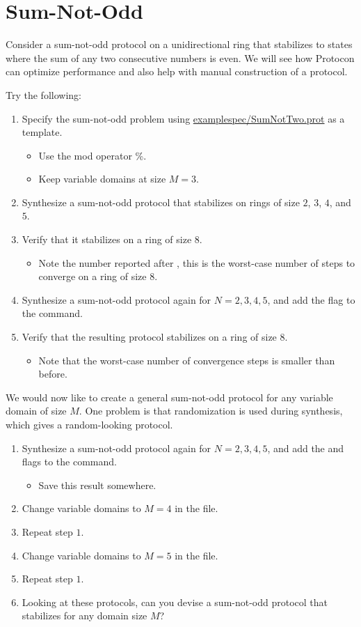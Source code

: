 \section{Sum-Not-Odd}

Consider a sum-not-odd protocol on a unidirectional ring that stabilizes to states where the sum of any two consecutive numbers is even.
We will see how Protocon can optimize performance and also help with manual construction of a protocol.

Try the following:
\begin{enumerate}
\item Specify the sum-not-odd problem using \href{\examplespec/SumNotTwo.prot}{examplespec/SumNotTwo.prot} as a template.
 \begin{itemize}
 \item Use the mod operator \%.
 \item Keep variable domains at size $M=3$.
 \end{itemize}
\item Synthesize a sum-not-odd protocol that stabilizes on rings of size $2$, $3$, $4$, and $5$.
\item Verify that it stabilizes on a ring of size $8$.
 \begin{itemize}
 \item Note the number reported after , this is the worst-case number of steps to converge on a ring of size $8$.
 \end{itemize}
\item Synthesize a sum-not-odd protocol again for $N=2,3,4,5$, and add the  flag to the command.
\item Verify that the resulting protocol stabilizes on a ring of size $8$.
 \begin{itemize}
 \item Note that the worst-case number of convergence steps is smaller than before.
 \end{itemize}
\end{enumerate}

We would now like to create a general sum-not-odd protocol for any variable domain of size $M$.
One problem is that randomization is used during synthesis, which gives a random-looking protocol.
\begin{enumerate}
\item Synthesize a sum-not-odd protocol again for $N=2,3,4,5$, and add the  and  flags to the command.
 \begin{itemize}
 \item Save this result somewhere.
 \end{itemize}
\item Change variable domains to $M=4$ in the file.
\item Repeat step $1$.
\item Change variable domains to $M=5$ in the file.
\item Repeat step $1$.
\item Looking at these protocols, can you devise a sum-not-odd protocol that stabilizes for any domain size $M$?
\end{enumerate}


